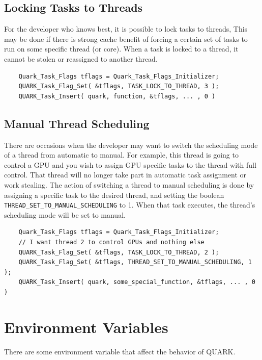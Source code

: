 \documentclass[11pt,letterpaper]{report}
\begin{document}
\subsection{Locking Tasks to Threads}
For the developer who knows best, it is possible to lock tasks to
threads, This may be done if there is strong cache benefit of forcing
a certain set of tasks to run on some specific thread (or core).  When
a task is locked to a thread, it cannot be stolen or reassigned to
another thread.
\begin{samepage}
\begin{lstlisting}
    Quark_Task_Flags tflags = Quark_Task_Flags_Initializer;
    QUARK_Task_Flag_Set( &tflags, TASK_LOCK_TO_THREAD, 3 );
    QUARK_Task_Insert( quark, function, &tflags, ... , 0 )
\end{lstlisting}
\end{samepage}


\subsection{Manual Thread Scheduling}
There are occasions when the developer may want to switch the
scheduling mode of a thread from automatic to manual.  For example,
this thread is going to control a GPU and you wish to assign GPU
specific tasks to the thread with full control.  That thread will no
longer take part in automatic task assignment or work stealing.  The
action of switching a thread to manual scheduling is done by assigning
a specific task to the desired thread, and setting the boolean
\verb|THREAD_SET_TO_MANUAL_SCHEDULING| to 1.  When that task executes,
the thread's scheduling mode will be set to manual.
\begin{samepage}
\begin{lstlisting}
    Quark_Task_Flags tflags = Quark_Task_Flags_Initializer;
    // I want thread 2 to control GPUs and nothing else
    QUARK_Task_Flag_Set( &tflags, TASK_LOCK_TO_THREAD, 2 );
    QUARK_Task_Flag_Set( &tflags, THREAD_SET_TO_MANUAL_SCHEDULING, 1 );
    QUARK_Task_Insert( quark, some_special_function, &tflags, ... , 0 )
\end{lstlisting}
\end{samepage}

\section{Environment Variables}

There are some environment variable that affect the behavior of
QUARK.
\end{document}
